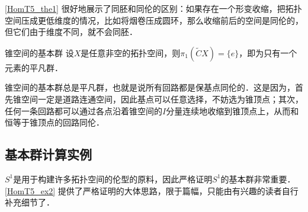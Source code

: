 \autoref{HomT5_the1} 很好地展示了同胚和同伦的区别：如果存在一个形变收缩，把拓扑空间压成更低维度的情况，比如将烟卷压成圆环，那么收缩前后的空间是同伦的，但它们由于维度不同，就不会同胚．

\begin{theorem}{锥空间的基本群}
设$X$是任意非空的拓扑空间，则$\pi_1(\widetilde{C}X)=\{e\}$，即为只有一个元素的平凡群．
\end{theorem}

锥空间的基本群总是平凡群，也就是说所有回路都是保基点同伦的．这是因为，首先锥空间一定是道路连通空间，因此基点可以任意选择，不妨选为锥顶点；其次，任何一条回路都可以通过各点沿着锥空间的$I$分量连续地收缩到锥顶点上，从而和恒等于锥顶点的回路同伦．



\subsection{基本群计算实例}


$S^1$是用于构建许多拓扑空间的伦型的原料，因此严格证明$S^1$的基本群非常重要．\autoref{HomT5_ex2} 提供了严格证明的大体思路，限于篇幅，只能由有兴趣的读者自行补充细节了．


